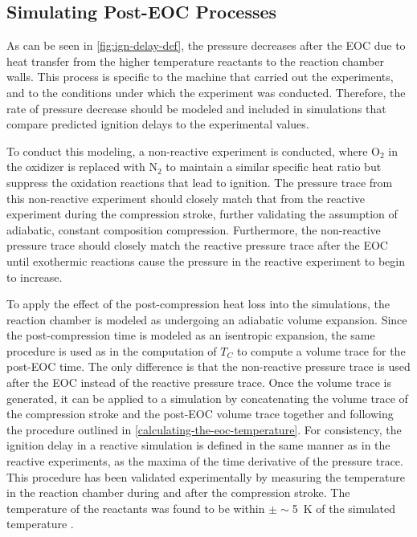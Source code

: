 \documentclass[12pt]{../ussci}
\begin{document}
\subsection{Simulating Post-EOC
Processes}\label{simulating-post-eoc-processes}

As can be seen in \cref{fig:ign-delay-def}, the pressure
decreases after the EOC due to heat transfer from the higher temperature
reactants to the reaction chamber walls. This process is specific to the
machine that carried out the experiments, and to the conditions under
which the experiment was conducted. Therefore, the rate of pressure
decrease should be modeled and included in simulations that compare
predicted ignition delays to the experimental values.

To conduct this modeling, a non-reactive experiment is conducted, where
\(\text{O}_2\) in the oxidizer is replaced with \(\text{N}_2\) to
maintain a similar specific heat ratio but suppress the oxidation
reactions that lead to ignition. The pressure trace from this
non-reactive experiment should closely match that from the reactive
experiment during the compression stroke, further validating the
assumption of adiabatic, constant composition compression. Furthermore,
the non-reactive pressure trace should closely match the reactive
pressure trace after the EOC until exothermic reactions cause the
pressure in the reactive experiment to begin to increase.

To apply the effect of the post-compression heat loss into the
simulations, the reaction chamber is modeled as undergoing an adiabatic
volume expansion. Since the post-compression time is modeled as an
isentropic expansion, the same procedure is used as in the computation
of \(T_C\) to compute a volume trace for the post-EOC time. The only
difference is that the non-reactive pressure trace is used after the EOC
instead of the reactive pressure trace. Once the volume trace is
generated, it can be applied to a simulation by concatenating the volume
trace of the compression stroke and the post-EOC volume trace together
and following the procedure outlined in \cref{calculating-the-eoc-temperature}.
For consistency, the ignition delay in a reactive
simulation is defined in the same manner as in the reactive experiments,
as the maxima of the time derivative of the pressure trace. This
procedure has been validated experimentally by measuring the temperature
in the reaction chamber during and after the compression stroke. The
temperature of the reactants was found to be within $\pm\sim $\SI{5}{\K} of the
simulated temperature \autocite{Das2012a,Uddi2012}.
\end{document}

